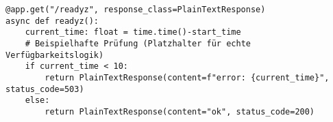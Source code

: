 \begin{verbatim}
@app.get("/readyz", response_class=PlainTextResponse)
async def readyz():
    current_time: float = time.time()-start_time
    # Beispielhafte Prüfung (Platzhalter für echte Verfügbarkeitslogik)
    if current_time < 10:
        return PlainTextResponse(content=f"error: {current_time}", status_code=503)
    else:
        return PlainTextResponse(content="ok", status_code=200)
\end{verbatim}
